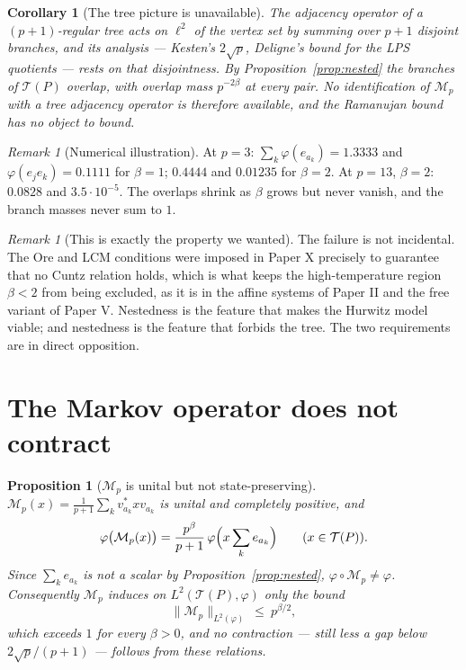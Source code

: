 \documentclass[11pt]{amsart}
\numberwithin{equation}{section}
\newtheorem{proposition}[theorem]{Proposition}
\newtheorem{corollary}[theorem]{Corollary}
\theoremstyle{definition}
\theoremstyle{remark}
\newtheorem{remark}[theorem]{Remark}
\newcommand{\cT}{\mathcal{T}}
\newcommand{\cM}{\mathcal{M}}
\begin{document}
\begin{corollary}[The tree picture is unavailable]\label{cor:notree}
The adjacency operator of a $(p+1)$-regular tree acts on $\ell^2$ of the vertex set by summing
over $p+1$ \emph{disjoint} branches, and its analysis --- Kesten's $2\sqrt p$, Deligne's
bound for the LPS quotients --- rests on that disjointness. By
Proposition~\ref{prop:nested} the branches of $\cT(P)$ overlap, with overlap mass
$p^{-2\beta}$ at every pair. No identification of $\cM_p$ with a tree adjacency operator is
therefore available, and the Ramanujan bound has no object to bound.
\end{corollary}

\begin{remark}[Numerical illustration]\label{rem:num1}
At $p=3$: $\sum_k\varphi(e_{a_k})=1.3333$ and $\varphi(e_je_k)=0.1111$ for $\beta=1$;
$0.4444$ and $0.01235$ for $\beta=2$. At $p=13$, $\beta=2$: $0.0828$ and $3.5\cdot10^{-5}$.
The overlaps shrink as $\beta$ grows but never vanish, and the branch masses never sum to $1$.
\end{remark}

\begin{remark}[This is exactly the property we wanted]\label{rem:tension}
The failure is not incidental. The Ore and LCM conditions were imposed in Paper X precisely
to guarantee that no Cuntz relation holds, which is what keeps the high-temperature region
$\beta<2$ from being excluded, as it is in the affine systems of Paper II and the free
variant of Paper V. Nestedness is the feature that makes the Hurwitz model viable; and
nestedness is the feature that forbids the tree. The two requirements are in direct
opposition.
\end{remark}

\section{The Markov operator does not contract}

\begin{proposition}[$\cM_p$ is unital but not state-preserving]\label{prop:notpreserving}
$\cM_p(x)=\frac{1}{p+1}\sum_kv_{a_k}^*xv_{a_k}$ is unital and completely positive, and
\begin{equation}\label{eq:notpres}
\varphi\bigl(\cM_p(x)\bigr)=\frac{p^{\beta}}{p+1}\,\varphi\Bigl(x\sum_{k}e_{a_k}\Bigr)
\qquad(x\in\cT(P)).
\end{equation}
Since $\sum_ke_{a_k}$ is not a scalar by Proposition~\ref{prop:nested}, $\varphi\circ\cM_p\ne\varphi$.
Consequently $\cM_p$ induces on $L^2(\cT(P),\varphi)$ only the bound
\[
\bigl\|\cM_p\bigr\|_{L^2(\varphi)}\ \le\ p^{\beta/2},
\]
which exceeds $1$ for every $\beta>0$, and no contraction --- still less a gap below
$2\sqrt p/(p+1)$ --- follows from these relations.
\end{proposition}
\end{document}
